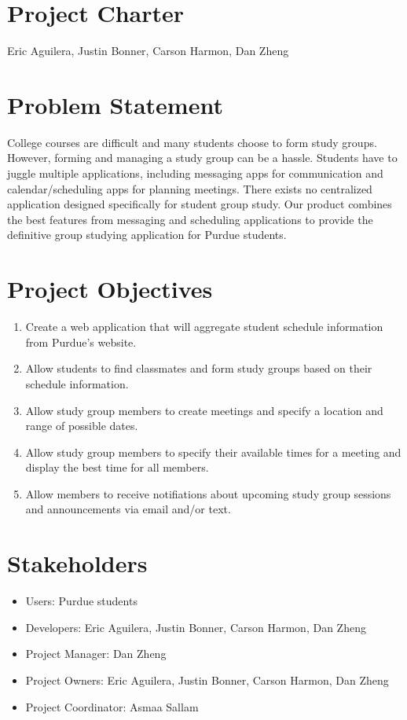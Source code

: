 \documentclass[12pt]{article}
\newcommand{\hwTitle}{Project Charter}
\newcommand{\authorName}{Eric Aguilera, Justin Bonner, Carson Harmon, Dan Zheng}
\begin{document}
\section*{\Large \centering \hwTitle}
{\centering \authorName \par}

\section{Problem Statement}

College courses are difficult and many students choose to form study groups. However, forming and managing a study group can be a hassle. Students have to juggle multiple applications, including messaging apps for communication and calendar/scheduling apps for planning meetings. There exists no centralized application designed specifically for student group study. Our product combines the best features from messaging and scheduling applications to provide the definitive group studying application for Purdue students.

\section{Project Objectives}
\begin{enumerate}[nolistsep]
    \item Create a web application that will aggregate student schedule information from Purdue's website.
    \item Allow students to find classmates and form study groups based on their schedule information.
    \item Allow study group members to create meetings and specify a location and range of possible dates.
    \item Allow study group members to specify their available times for a meeting and display the best time for all members.
    \item Allow members to receive notifiations about upcoming study group sessions and announcements via email and/or text.
\end{enumerate}

\section{Stakeholders}
\begin{itemize}[nolistsep]
    \item Users: Purdue students
    \item Developers: Eric Aguilera, Justin Bonner, Carson Harmon, Dan Zheng
    \item Project Manager: Dan Zheng
    \item Project Owners: Eric Aguilera, Justin Bonner, Carson Harmon, Dan Zheng
    \item Project Coordinator: Asmaa Sallam
\end{itemize}
\end{document}
